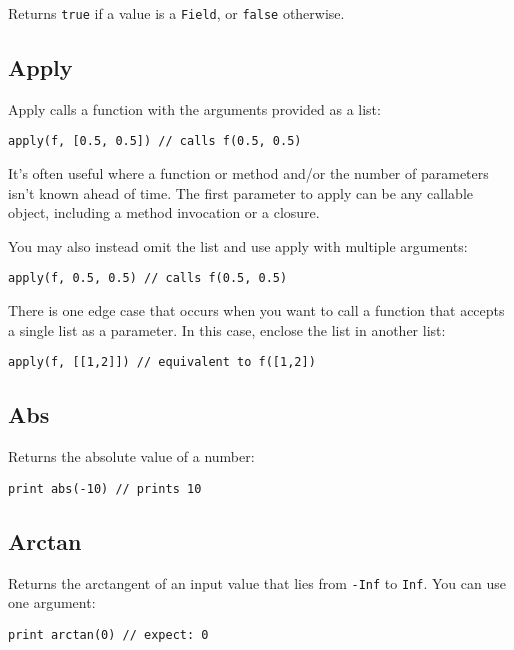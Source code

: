 Returns \texttt{true} if a value is a \texttt{Field}, or \texttt{false}
otherwise.

\hypertarget{apply}{%
\subsection{Apply}\label{apply}}

Apply calls a function with the arguments provided as a list:

\begin{lstlisting}
apply(f, [0.5, 0.5]) // calls f(0.5, 0.5) 
\end{lstlisting}

It's often useful where a function or method and/or the number of
parameters isn't known ahead of time. The first parameter to apply can
be any callable object, including a method invocation or a closure.

You may also instead omit the list and use apply with multiple
arguments:

\begin{lstlisting}
apply(f, 0.5, 0.5) // calls f(0.5, 0.5)
\end{lstlisting}

There is one edge case that occurs when you want to call a function that
accepts a single list as a parameter. In this case, enclose the list in
another list:

\begin{lstlisting}
apply(f, [[1,2]]) // equivalent to f([1,2])
\end{lstlisting}

\hypertarget{abs}{%
\subsection{Abs}\label{abs}}

Returns the absolute value of a number:

\begin{lstlisting}
print abs(-10) // prints 10 
\end{lstlisting}

\hypertarget{arctan}{%
\subsection{Arctan}\label{arctan}}

Returns the arctangent of an input value that lies from \texttt{-Inf} to
\texttt{Inf}. You can use one argument:

\begin{lstlisting}
print arctan(0) // expect: 0
\end{lstlisting}

